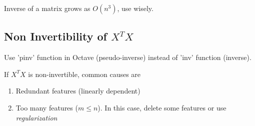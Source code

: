 Inverse of a matrix grows as $O(n^3)$, use wisely.

\subsection{Non Invertibility of \texorpdfstring{$X^TX$}{}}
Use 'pinv' function in Octave (pseudo-inverse) instead of 'inv' function (inverse).

If $X^TX$ is non-invertible, common causes are
\begin{enumerate}
    \item Redundant features (linearly dependent)
    \item Too many features ($m \le n$). In this case, delete some features or use \emph{regularization}
\end{enumerate}

